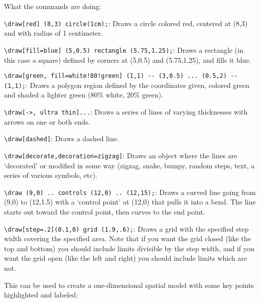 \documentclass[10.5pt]{article}
\begin{document}
What the commands are doing: \\

\begin{compactitem}
\item \verb+\draw[red] (8,3) circle(1cm);+: Draws a circle colored red, centered at (8,3) and with radius of 1 centimeter.
\item \verb+\draw[fill=blue] (5,0.5) rectangle (5.75,1.25);+: Draws a rectangle (in this case a square) defined by corners at (5,0.5) and (5.75,1.25), and fills it blue.
\item \verb+\draw[green, fill=white!80!green] (1,1) -- (3,0.5) ... (0.5,2) -- (1,1);+: Draws a polygon region defined by the coordinates given, colored green and shaded a lighter green (80\% white, 20\% green). 
\item \verb+\draw[->, ultra thin]...+: Draws a series of lines of varying thicknesses with arrows on one or both ends.
\item \verb+\draw[dashed]+: Draws a dashed line.
\item \verb+\draw[decorate,decoration=zigzag]+: Draws an object where the lines are `decorated' or modified in some way (zigzag, snake, bumpy, random steps, text, a series of various symbols, etc).
\item \verb+\draw (9,0) .. controls (12,0) .. (12,15);+: Draws a curved line going from (9,0) to (12,1.5) with a `control point' at (12,0) that pulls it into a bend.  The line starts out toward the control point, then curves to the end point.
\item \verb+\draw[step=.2](0.1,0) grid (1.9,.6);+: Draws a grid with the specified step width covering the specified area.  Note that if you want the grid closed (like the top and bottom) you should include limits divisible by the step width, and if you want the grid open (like the left and right) you should include limits which are not.\\
\end{compactitem}

\clearpage

This can be used to create a one-dimensional spatial model with some key points highlighted and labeled:\\
\end{document}
